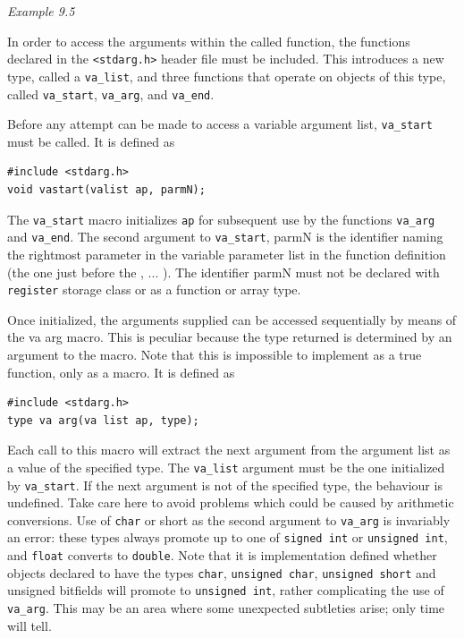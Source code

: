   \begin{center}\textit{Example 9.5}\end{center}


  In order to access the arguments within the called function, the functions
   declared in the \texttt{<stdarg.h>} header file must be included.
   This introduces a new type, called a \texttt{va\_list}, and three
   functions that operate on objects of this type, called
   \texttt{va\_start}, \texttt{va\_arg}, and \texttt{va\_end}.


  Before any attempt can be made to access a variable argument list,
   \texttt{va\_start} must be called.  It is defined as


  \begin{Verbatim}
#include <stdarg.h>
void vastart(valist ap, parmN);
\end{Verbatim}

  The \texttt{va\_start} macro initializes \texttt{ap} for subsequent
   use by  the functions   \texttt{va\_arg}  and  \texttt{va\_end}.   The
   second  argument  to \texttt{va\_start}, parmN  is  the
   identifier  naming  the  rightmost parameter  in  the  variable  parameter
   list in the function definition (the one just before the , ... ).  The
   identifier parmN must not be declared with \texttt{register}
   storage class or as a function or array type.


  Once initialized, the arguments  supplied  can  be  accessed sequentially
   by means of the va arg macro. This is peculiar because the type returned is
   determined by  an  argument  to the  macro.  Note  that this is impossible
   to implement as a true function, only as a macro. It is defined as


  \begin{Verbatim}
#include <stdarg.h>
type va arg(va list ap, type);
\end{Verbatim}

  Each call to this macro will extract the next argument  from the  argument
   list  as  a value of the specified type.  The \texttt{va\_list} argument
   must be the one  initialized  by  \texttt{va\_start}.  If  the  next
   argument  is  not  of the specified type, the behaviour is undefined.  Take
   care here  to  avoid  problems which  could  be  caused  by arithmetic
   conversions.  Use of \texttt{char} or short as the second argument to
   \texttt{va\_arg} is invariably an error: these types always promote up to
   one of \texttt{signed int} or \texttt{unsigned int}, and
   \texttt{float} converts to \texttt{double}.  Note that it is
   implementation  defined whether objects declared to have the types
   \texttt{char}, \texttt{unsigned char}, \texttt{unsigned short}
   and  unsigned bitfields  will promote to \texttt{unsigned int}, rather
   complicating the  use  of  \texttt{va\_arg}.   This  may  be  an  area
   where  some unexpected subtleties arise; only time will tell.


